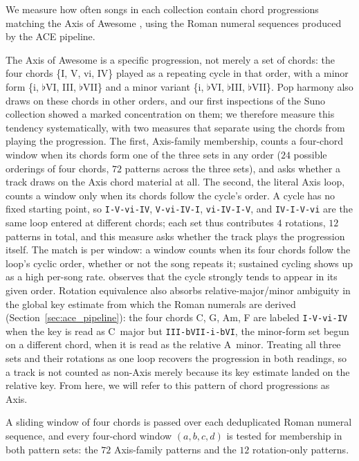 \documentclass{article}
\begin{document}
We measure how often songs in each collection contain chord progressions matching the Axis of Awesome \citep{richards2017tonal}, using the Roman numeral sequences produced by the ACE pipeline. %

The Axis of Awesome is a specific progression, not merely a set of chords: the four chords \{I, V, vi, IV\} played as a repeating cycle in that order, with a minor form \{i, $\flat$VI, III, $\flat$VII\} and a minor variant \{i, $\flat$VI, $\flat$III, $\flat$VII\}. Pop harmony also draws on these chords in other orders, and our first inspections of the Suno collection showed a marked concentration on them; we therefore measure this tendency systematically, with two measures that separate using the chords from playing the progression. The first, Axis-family membership, counts a four-chord window when its chords form one of the three sets in any order ($24$ possible orderings of four chords, $72$ patterns across the three sets), and asks whether a track draws on the Axis chord material at all. The second, the literal Axis loop, counts a window only when its chords follow the cycle's order. A cycle has no fixed starting point, so \texttt{I-V-vi-IV}, \texttt{V-vi-IV-I}, \texttt{vi-IV-I-V}, and \texttt{IV-I-V-vi} are the same loop entered at different chords; each set thus contributes $4$ rotations, $12$ patterns in total, and this measure asks whether the track plays the progression itself. The match is per window: a window counts when its four chords follow the loop's cyclic order, whether or not the song repeats it; sustained cycling shows up as a high per-song rate. \citet{richards2017tonal} observes that the cycle strongly tends to appear in its given order. Rotation equivalence also absorbs relative-major/minor ambiguity in the global key estimate from which the Roman numerals are derived (Section~\ref{sec:ace_pipeline}): the four chords C, G, Am, F are labeled \texttt{I-V-vi-IV} when the key is read as C~major but \texttt{III-bVII-i-bVI}, the minor-form set begun on a different chord, when it is read as the relative A~minor. Treating all three sets and their rotations as one loop recovers the progression in both readings, so a track is not counted as non-Axis merely because its key estimate landed on the relative key. From here, we will refer to this pattern of chord progressions as Axis.

A sliding window of four chords is passed over each deduplicated Roman numeral sequence, and every four-chord window $(a, b, c, d)$ is tested for membership in both pattern sets: the $72$ Axis-family patterns and the $12$ rotation-only patterns.
\end{document}
